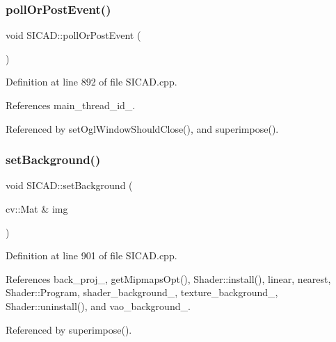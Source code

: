 \subsubsection{\texorpdfstring{poll\+Or\+Post\+Event()}{pollOrPostEvent()}}
{\footnotesize\ttfamily void S\+I\+C\+A\+D\+::poll\+Or\+Post\+Event (\begin{DoxyParamCaption}{ }\end{DoxyParamCaption})\hspace{0.3cm}{\ttfamily [private]}}



Definition at line 892 of file S\+I\+C\+A\+D.\+cpp.



References main\+\_\+thread\+\_\+id\+\_\+.



Referenced by set\+Ogl\+Window\+Should\+Close(), and superimpose().

\mbox{\label{classSICAD_a25b180f54f2e93d69b291cc225600c8e}} 
\subsubsection{\texorpdfstring{set\+Background()}{setBackground()}}
{\footnotesize\ttfamily void S\+I\+C\+A\+D\+::set\+Background (\begin{DoxyParamCaption}\item[{cv\+::\+Mat \&}]{img }\end{DoxyParamCaption})\hspace{0.3cm}{\ttfamily [private]}}



Definition at line 901 of file S\+I\+C\+A\+D.\+cpp.



References back\+\_\+proj\+\_\+, get\+Mipmaps\+Opt(), Shader\+::install(), linear, nearest, Shader\+::\+Program, shader\+\_\+background\+\_\+, texture\+\_\+background\+\_\+, Shader\+::uninstall(), and vao\+\_\+background\+\_\+.



Referenced by superimpose().

